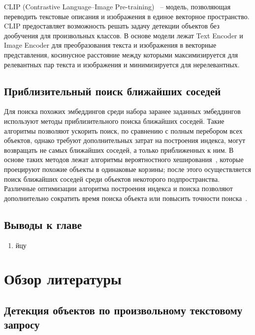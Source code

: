 \documentclass[a4paper,14pt]{article}
\begin{document}
    CLIP (Contrastive Language–Image Pre-training)~\cite{CLIP} -- модель, позволяющая переводить текстовые описания и изображения в единое векторное пространство.
    CLIP предоставляет возможность решать задачу детекции объектов без дообучения для произвольных классов.
    В основе модели лежат Text Encoder и Image Encoder для преобразования текста и изображения в векторные представления, косинусное расстояние между которыми максимизируется для релевантных пар текста и изображения и минимизируется для нерелевантных.
    
    \subsection{Приблизительный поиск ближайших соседей}
    
    Для поиска похожих эмбеддингов среди набора заранее заданных эмбеддингов используют методы приблизительного поиска ближайших соседей.
    Такие алгоритмы позволяют ускорить поиск, по сравнению с полным перебором всех объектов, однако требуют дополнительных затрат на построения индекса, 
    могут возвращать не самых ближайших соседей, а только приближенных к ним.
    В основе таких методов лежат алгоритмы вероятностного хеширования~\cite{tao2010efficient}, которые проецируют похожие объекты в одинаковые корзины;
    после этого осуществляется поиск ближайших соседей среди объектов некоторого подпространства.
    Различные оптимизации алгоритма построения индекса и поиска позволяют дополнительно сократить время поиска объекта или повысить точности поиска~\cite{annoy,avq_2020}.
    
    \subsection{Выводы к главе \thesection}
    \begin{enumerate}
    	[1)]
    	\itemsep0em
    	\item йцу
    \end{enumerate}
    
    \newpage
    
 	\section{Обзор литературы}

    \subsection{Детекция объектов по произвольному текстовому запросу}
\end{document}
